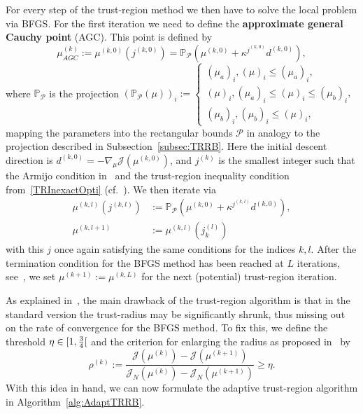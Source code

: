 For every step of the trust-region method we then have to solve the local problem via BFGS.\@
For the first iteration we need to define the \textbf{approximate general Cauchy point} (AGC).
This point is defined by
\begin{equation*}\label{AGCPoint}
    \mu_{AGC}^{(k)} := \mu^{(k, 0)}(j^{(k, 0)}) = \mathbb{P}_{\mathcal{P}} \left( \mu^{(k, 0)} + \kappa^{j^{(k, 0)}} d^{(k, 0)} \right),
\end{equation*}
where $\mathbb{P}_\mathcal{P}$ is the projection ${\left( \mathbb{P}_\mathcal{P}(\mu) \right)}_i := \begin{cases}
    {(\mu_a)}_i, {(\mu)}_i \leq {(\mu_a)}_i, \\
    {(\mu)}_i, {(\mu_a)}_i \leq {(\mu)}_i \leq {(\mu_b)}_i, \\
    {(\mu_b)}_i, {(\mu_b)}_i \leq {(\mu)}_i,
\end{cases}$
mapping the parameters into the rectangular bounds $\mathcal{P}$ in analogy to the projection described in Subsection~\ref{subsec:TRRB}.
Here the initial descent direction is $d^{(k, 0)} = - \nabla_\mu \mathcal{J}(\mu^{(k, 0)})$, and $j^{(k)}$ is the smallest integer such that the Armijo condition in~\cite[Inequality 4.4]{Keil2021} and the trust-region inequality condition from~\eqref{TRInexactOpti} (cf.~\cite[Inequality 4.5]{Keil2021}).
We then iterate via
\begin{align*}
    \mu^{(k, l)}(j^{(k, l)}) &:= \mathbb{P}_\mathcal{P} \left( \mu^{(k, 0)} + \kappa^{j^{(k, l)}} d^{(k, 0)} \right), \\
    \mu^{(k, l+ 1)} &:= \mu^{(k, l)}(j_k^{(l)})
\end{align*}
with this $j$ once again satisfying the same conditions for the indices $k, l$.
After the termination condition for the BFGS method has been reached at $L$ iterations, see~\cite[Inequalities 4.6a and 4.6b]{Keil2021}, we set $\mu^{(k + 1)} := \mu^{(k, L)}$ for the next (potential) trust-region iteration.

As explained in~\cite{Keil2021}, the main drawback of the trust-region algorithm is that in the standard version the trust-radius may be significantly shrunk, thus missing out on the rate of convergence for the BFGS method.
To fix this, we define the threshold $\eta \in \interval[open right]{1}{\frac{3}{4}}$ and the criterion for enlarging the radius as proposed in~\cite[Inequality 4.7]{Keil2021} by
\begin{equation*}\label{EnlargingCriterion}
    \rho^{(k)} := \frac{\mathcal{J}(\mu^{(k)}) - \mathcal{J}(\mu^{(k + 1)})}{\mathcal{J}_N(\mu^{(k)}) - \mathcal{J}_N(\mu^{(k + 1)})} \geq \eta.
\end{equation*}
With this idea in hand, we can now formulate the adaptive trust-region algorithm in Algorithm~\ref{alg:AdaptTRRB}.



